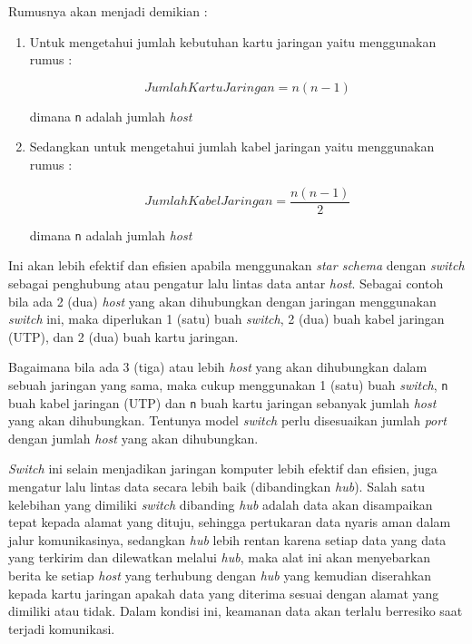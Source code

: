 \documentclass[pdftex,12pt, oneside]{article}
\begin{document}
\begin{enumerate}
Rumusnya akan menjadi demikian :

	\begin{enumerate}

		\item Untuk mengetahui jumlah kebutuhan kartu jaringan yaitu menggunakan rumus :

\[ JumlahKartuJaringan = n(n - 1) \]		

dimana \texttt{n} adalah jumlah \textit{host}

		\item Sedangkan untuk mengetahui jumlah kabel jaringan yaitu menggunakan rumus :

\[ JumlahKabelJaringan = \frac{n(n-1)}{2} \]

dimana \texttt{n} adalah jumlah \textit{host}
		
	\end{enumerate}

Ini akan lebih efektif dan efisien apabila menggunakan \textit{star schema} dengan \textit{switch} sebagai penghubung atau pengatur lalu lintas data antar \textit{host}. Sebagai contoh bila ada 2 (dua) \textit{host} yang akan dihubungkan dengan jaringan menggunakan \textit{switch} ini, maka diperlukan 1 (satu) buah \textit{switch}, 2 (dua) buah kabel jaringan (UTP), dan 2 (dua) buah kartu jaringan.

Bagaimana bila ada 3 (tiga) atau lebih \textit{host} yang akan dihubungkan dalam sebuah jaringan yang sama, maka cukup menggunakan 1 (satu) buah \textit{switch}, \texttt{n} buah kabel jaringan (UTP) dan \texttt{n} buah kartu jaringan sebanyak jumlah \textit{host} yang akan dihubungkan. Tentunya model \textit{switch} perlu disesuaikan jumlah \textit{port} dengan jumlah \textit{host} yang akan dihubungkan.

\textit{Switch} ini selain menjadikan jaringan komputer lebih efektif dan efisien, juga mengatur lalu lintas data secara lebih baik (dibandingkan \textit{hub}). Salah satu kelebihan yang dimiliki \textit{switch} dibanding \textit{hub} adalah data akan disampaikan tepat kepada alamat yang dituju, sehingga pertukaran data nyaris aman dalam jalur komunikasinya, sedangkan \textit{hub} lebih rentan karena setiap data yang data yang terkirim dan dilewatkan melalui \textit{hub}, maka alat ini akan menyebarkan berita ke setiap \textit{host} yang terhubung dengan \textit{hub} yang kemudian diserahkan kepada kartu jaringan apakah data yang diterima sesuai dengan alamat yang dimiliki atau tidak. Dalam kondisi ini, keamanan data akan terlalu berresiko saat terjadi komunikasi.


\end{enumerate}
\end{document}
